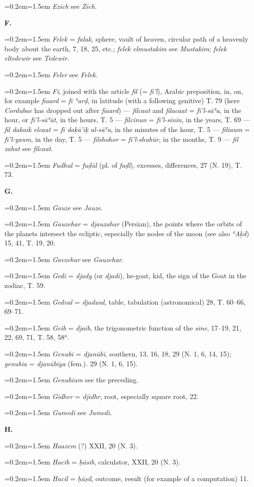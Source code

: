 \documentclass[11pt]{article}
\newcommand{\Pg}[1]{\marginpar{\footnotesize\color{gray}#1}}
\newcommand{\Entry}[1]{\par{\parskip=0.2em\relax\noindent\hangindent=1.5em\hangafter=1 #1\par}}
\begin{document}
\Entry{\emph{Ezich} see \emph{Zich}.}
\par\begin{center}\textbf{F.}\end{center}
\Entry{\emph{Felek} = \emph{falak}, sphere, vault of heaven, circular path of a heavenly body about the earth, 7, 18, 25, etc.; \emph{felek elmustakim} see \emph{Mustakim}; \emph{felek eltedewir} see \emph{Tedewir}.}
\Entry{\emph{Feler} see \emph{Felek}.}
\Entry{\emph{Fi}, joined with the article \emph{fil} (= \emph{fi’l}), Arabic preposition, in, on, for example \emph{fiaard} = \emph{fī ʿarḍ}, in latitude (with a following genitive) T. 79 (here \emph{Cordubae} has dropped out after \emph{fiaard}) — \emph{filcaat} and \emph{filacaat} = \emph{fī’l-sāʿa}, in the hour, or \emph{fī’l-sāʿāt}, in the hours, T. 5 — \emph{filcinun} = \emph{fī’l-sinīn}, in the years, T. 69 — \emph{fil dakaik elcaat} = \emph{fī daḳā’iḳ al-sāʿa}, in the minutes of the hour, T. 5 — \emph{filiaum} = \emph{fī’l-yaum}, in the day, T. 5 — \emph{filshohor} = \emph{fī’l-shuhūr}, in the months, T. 9 — \emph{fil zahat} see \emph{filcaat}.}
\Entry{\emph{Fudhul} = \emph{fuḍūl} (pl. of \emph{faḍl}), excesses, differences, 27 (N. 19), T. 73.}
\par\begin{center}\Pg{243}\textbf{G.}\end{center}
\Entry{\emph{Gauze} see \emph{Jauze}.}
\Entry{\emph{Gauzehar} = \emph{djauzahar} (Persian), the points where the orbits of the planets intersect the ecliptic, especially the nodes of the moon (see also \emph{ʿAḳd}) 15, 41, T. 19, 20.}
\Entry{\emph{Gavzehar} see \emph{Gauzehar}.}
\Entry{\emph{Gedi} = \emph{djady} (or \emph{djadi}), he-goat, kid, the sign of the Goat in the zodiac, T. 59.}
\Entry{\emph{Gedval} = \emph{djadwal}, table, tabulation (astronomical) 28, T. 60–66, 69–71.}
\Entry{\emph{Geib} = \emph{djaib}, the trigonometric function of the \emph{sine}, 17–19, 21, 22, 69, 71, T. 58, 58$^{a}$.}
\Entry{\emph{Genubi} = \emph{djanūbī}, southern, 13, 16, 18, 29 (N. 1, 6, 14, 15); \emph{genubia} = \emph{djanūbīya} (fem.). 29 (N. 1, 6, 15).}
\Entry{\emph{Genubium} see the preceding.}
\Entry{\emph{Gidher} = \emph{djidhr}, root, especially square root, 22.}
\Entry{\emph{Gumedi} see \emph{Jumedi}.}
\par\begin{center}\textbf{H.}\end{center}
\Entry{\emph{Haazem} (?) XXII, 20 (N. 3).}
\Entry{\emph{Hacib} = \emph{ḥāsib}, calculator, XXII, 20 (N. 3).}
\Entry{\emph{Hacil} = \emph{ḥāṣil}, outcome, result (for example of a computation) 11.}
\end{document}
